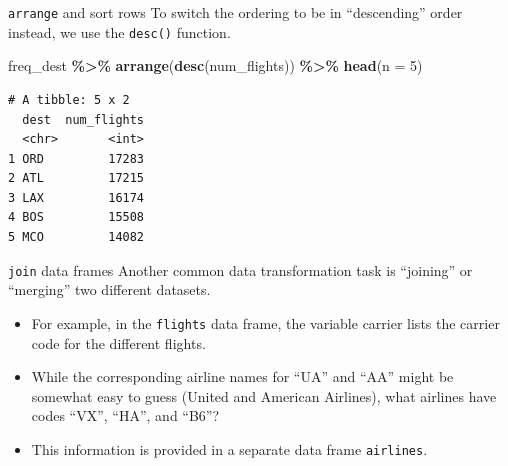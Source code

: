 \documentclass[
  ignorenonframetext,
]{beamer}
\newenvironment{Shaded}{\begin{snugshade}}{\end{snugshade}}
\newcommand{\AttributeTok}[1]{\textcolor[rgb]{0.13,0.29,0.53}{#1}}
\newcommand{\DecValTok}[1]{\textcolor[rgb]{0.00,0.00,0.81}{#1}}
\newcommand{\FunctionTok}[1]{\textcolor[rgb]{0.13,0.29,0.53}{\textbf{#1}}}
\newcommand{\NormalTok}[1]{#1}
\newcommand{\SpecialCharTok}[1]{\textcolor[rgb]{0.81,0.36,0.00}{\textbf{#1}}}
\begin{document}
\begin{frame}[fragile]{\texttt{arrange} and sort rows}
\protect\hypertarget{arrange-and-sort-rows-3}{}
To switch the ordering to be in ``descending'' order instead, we use the
\texttt{desc()} function.

\normalsize

\begin{Shaded}
\begin{Highlighting}[]
\NormalTok{freq\_dest }\SpecialCharTok{\%\textgreater{}\%} 
  \FunctionTok{arrange}\NormalTok{(}\FunctionTok{desc}\NormalTok{(num\_flights)) }\SpecialCharTok{\%\textgreater{}\%} 
  \FunctionTok{head}\NormalTok{(}\AttributeTok{n =} \DecValTok{5}\NormalTok{)}
\end{Highlighting}
\end{Shaded}

\begin{verbatim}
# A tibble: 5 x 2
  dest  num_flights
  <chr>       <int>
1 ORD         17283
2 ATL         17215
3 LAX         16174
4 BOS         15508
5 MCO         14082
\end{verbatim}

\normalsize
\end{frame}

\begin{frame}[fragile]{\texttt{join} data frames}
\protect\hypertarget{join-data-frames}{}
Another common data transformation task is ``joining'' or ``merging''
two different datasets.

\begin{itemize}
\item
  For example, in the \texttt{flights} data frame, the variable carrier
  lists the carrier code for the different flights.
\item
  While the corresponding airline names for ``UA'' and ``AA'' might be
  somewhat easy to guess (United and American Airlines), what airlines
  have codes ``VX'', ``HA'', and ``B6''?
\item
  This information is provided in a separate data frame
  \texttt{airlines}.
\end{itemize}
\end{frame}
\end{document}
